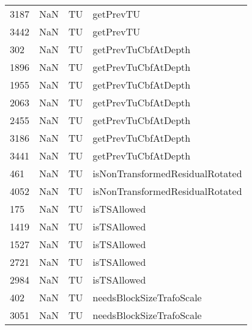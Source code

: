 \begin{tabular}{llll}
3187 &                   NaN &                         TU &                                 getPrevTU \\
3442 &                   NaN &                         TU &                                 getPrevTU \\
302  &                   NaN &                         TU &                       getPrevTuCbfAtDepth \\
1896 &                   NaN &                         TU &                       getPrevTuCbfAtDepth \\
1955 &                   NaN &                         TU &                       getPrevTuCbfAtDepth \\
2063 &                   NaN &                         TU &                       getPrevTuCbfAtDepth \\
2455 &                   NaN &                         TU &                       getPrevTuCbfAtDepth \\
3186 &                   NaN &                         TU &                       getPrevTuCbfAtDepth \\
3441 &                   NaN &                         TU &                       getPrevTuCbfAtDepth \\
461  &                   NaN &                         TU &           isNonTransformedResidualRotated \\
4052 &                   NaN &                         TU &           isNonTransformedResidualRotated \\
175  &                   NaN &                         TU &                               isTSAllowed \\
1419 &                   NaN &                         TU &                               isTSAllowed \\
1527 &                   NaN &                         TU &                               isTSAllowed \\
2721 &                   NaN &                         TU &                               isTSAllowed \\
2984 &                   NaN &                         TU &                               isTSAllowed \\
402  &                   NaN &                         TU &                  needsBlockSizeTrafoScale \\
3051 &                   NaN &                         TU &                  needsBlockSizeTrafoScale \\

\end{tabular}
